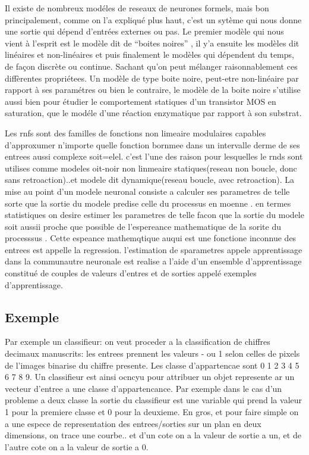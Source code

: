 \documentclass[a4paper,12pt]{report}
\begin{document}
Il existe de nombreux mod\'eles de reseaux de neurones formels, mais
bon principalement, comme on l'a expliqu\'e plus haut, c'est un
syt\`eme qui nous donne une sortie qui d\'epend d'entr\'ees externes
ou pas. Le premier mod\`ele qui nous vient \`a l'esprit est le
mod\`ele dit de ``boites noires'' , il y'a ensuite les mod\`eles dit
lin\'eaires et non-lin\'eaires et puis finalement le mod\`eles qui
d\'ependent du temps, de fa\c con discr\`ete ou continue. Sachant
qu'on peut m\'elanger raisonnablement ces diff\`erentes propri\'etees.
Un mod\`ele de type boite noire, peut-etre non-lin\'eaire par rapport
\`a ses param\'etres ou bien le contraire, le mod\`ele de la boite
noire s'utilise aussi bien pour \'etudier le comportement statiques
d'un transistor MOS en saturation, que le mod\'ele d'une r\'eaction
enzymatique par rapport \`a son substrat.

Les rnfs sont des familles de fonctions non limeaire modulaires
capables d'approxumer n'importe quelle fonction bornmee dans un
intervalle derme de ses entrees aussi complexe soit=elel. c'est l'une
des raison pour lesquelles le rnds sont utilises comme modeles
oit-noir non linmeaire statiques(reseau non boucle, donc sans
retroaction)..et modele dit dynamique(reseau boucle, avec
retroaction). La mise au point d'un modele neuronal consiste a
calculer ses parametres de telle sorte que la sortie du modele predise
celle du processus en moenne . en termes statistiques on desire
estimer les parametres de telle facon que la sortie du modele soit
aussii proche que possible de l'espereance mathematique de la sorite
du processsus . Cette espeance mathemqtique auqui est une fonctione
inconnue des entrees est appelle la regression. l'estimation de
sparametres appele apprentissage dans la communautre neuronale est
realise  a l'aide d'un ensemble d'apprentissage constitu\'e de couples
de valeurs d'entres et de sorties appel\'e exemples d'apprentissage.

\subsection{Exemple}
Par exemple un classifieur: on veut proceder a la classification de
chiffres decimaux manuscrits: les entrees prennent les valeurs - ou 1
selon celles de pixels de l'images binarise du chiffre presente. Les
classe d'appartencae sont {0 1 2 3 4 5 6 7 8 9}.
Un classifieur est ainsi ocncyu pour attribuer un objet represente ar
un vecteur d'entree a une classe d'appartencance. Par exemple dans le
cas d'un probleme a deux classe la sortie du classifieur est une
variable qui prend la valeur 1 pour la premiere classe et 0 pour la
deuxieme.
En gros, et pour faire simple on a une espece de representation des
entrees/sorties sur un plan en deux dimensions, on trace une
courbe.. et d'un cote on a la valeur de sortie a un, et de l'autre
cote on a la valeur de sortie a 0.
\end{document}
